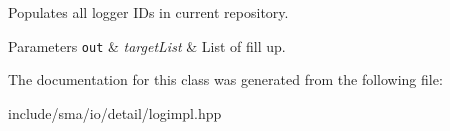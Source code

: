 Populates all logger I\-Ds in current repository. 


\begin{DoxyParams}[1]{Parameters}
\mbox{\tt out}  & {\em target\-List} & List of fill up. \\
\hline
\end{DoxyParams}


The documentation for this class was generated from the following file\-:\begin{DoxyCompactItemize}
\item 
include/sma/io/detail/logimpl.\-hpp\end{DoxyCompactItemize}
